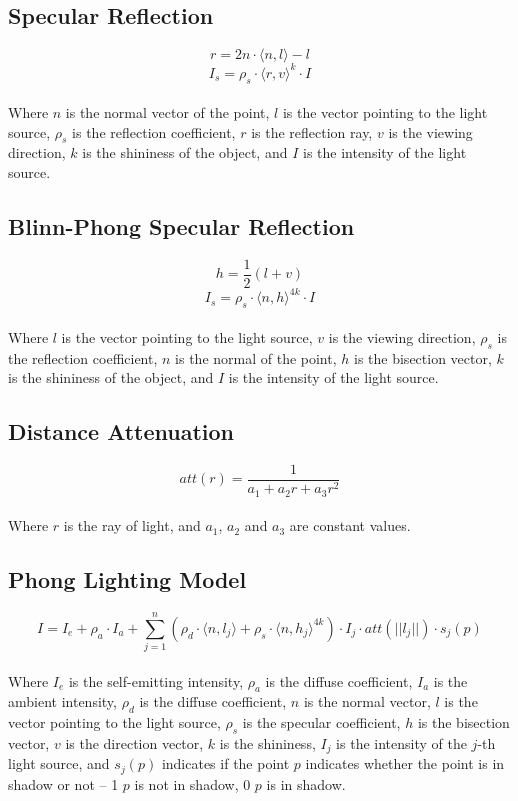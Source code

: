 \documentclass{article}
\begin{document}
\subsection{Specular Reflection}
\vspace{.3cm}
\[ r = 2n \cdot \langle n, l \rangle - l \]
\[ I_s = \rho_s \cdot \langle r, v \rangle^k \cdot I \] \\
Where $n$ is the normal vector of the point, $l$ is the vector pointing to the light source, $\rho_s$ is the reflection coefficient, $r$ is the reflection ray, $v$ is the viewing direction, $k$ is the shininess of the object, and $I$ is the intensity of the light source.

\subsection{Blinn-Phong Specular Reflection}
\vspace{.3cm}
\[ h = \frac{1}{2}(l + v) \]
\[ I_s = \rho_s \cdot \langle n, h \rangle^{4k} \cdot I \] \\
Where $l$ is the vector pointing to the light source, $v$ is the viewing direction, $\rho_s$ is the reflection coefficient, $n$ is the normal of the point, $h$ is the bisection vector, $k$ is the shininess of the object, and $I$ is the intensity of the light source.

\subsection{Distance Attenuation}
\vspace{.3cm}
\[ att(r) = \frac{1}{a_1 + a_2r + a_3r^2} \] \\
Where $r$ is the ray of light, and $a_1$, $a_2$ and $a_3$ are constant values.

\subsection{Phong Lighting Model}
\vspace{.3cm}
\[ I = I_e + \rho_a \cdot I_a + \sum^n_{j = 1} (\rho_d \cdot \langle n, l_j \rangle + \rho_s \cdot \langle n, h_j \rangle^{4k}) \cdot I_j \cdot att(||l_j||) \cdot s_j(p) \] \\
Where $I_e$ is the self-emitting intensity, $\rho_a$ is the diffuse coefficient, $I_a$ is the ambient intensity, $\rho_d$ is the diffuse coefficient, $n$ is the normal vector, $l$ is the vector pointing to the light source, $\rho_s$ is the specular coefficient, $h$ is the bisection vector, $v$ is the direction vector, $k$ is the shininess, $I_j$ is the intensity of the $j$-th light source, and $s_j(p)$ indicates if the point $p$ indicates whether the point is in shadow or not -- 1 $p$ is not in shadow, 0 $p$ is in shadow.
\end{document}
